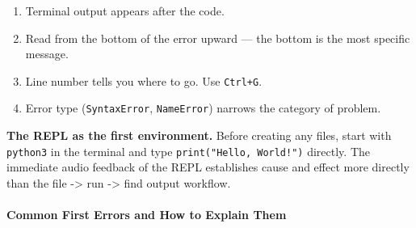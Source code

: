 \documentclass[
  justified,
  openright,
]{tufte-book}
\let\paragraph\paragraph
\let\paragraph\paragraph
\providecommand{\tightlist}{%
  \setlength{\itemsep}{0pt}\setlength{\parskip}{0pt}}
\begin{document}
\begin{enumerate}
\def\labelenumi{\arabic{enumi}.}
\tightlist
\item
  Terminal output appears after the code.
\item
  Read from the bottom of the error upward --- the bottom is the most
  specific message.
\item
  Line number tells you where to go. Use \texttt{Ctrl+G}.
\item
  Error type (\texttt{SyntaxError}, \texttt{NameError}) narrows the
  category of problem.
\end{enumerate}

\textbf{The REPL as the first environment.} Before creating any files,
start with \texttt{python3} in the terminal and type
\texttt{print("Hello,\ World!")} directly. The immediate audio feedback
of the REPL establishes cause and effect more directly than the file
-\textgreater{} run -\textgreater{} find output workflow.

\paragraph{Common First Errors and How to Explain
Them}\label{common-first-errors-and-how-to-explain-them}
\end{document}
